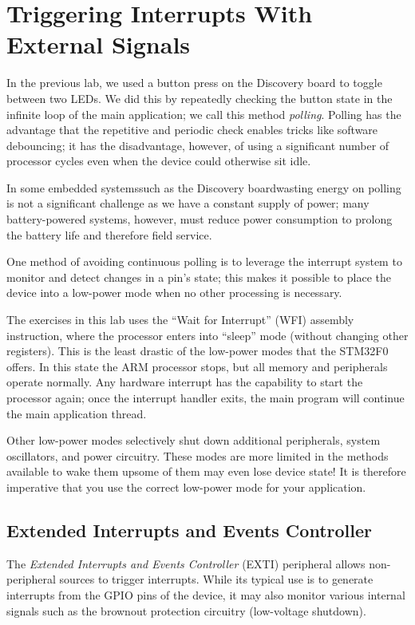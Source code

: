 \documentclass[openany,11pt,fleqn]{book} %
\begin{document}
\section{Triggering Interrupts With External Signals}

In the previous lab, we used a button press on the Discovery board to toggle between two LEDs. We did this by repeatedly checking the button state in the infinite loop of the main application; we call this method \textit{polling}. Polling has the advantage that the repetitive and periodic check enables tricks like software debouncing; it has the disadvantage, however, of using a significant number of processor cycles even when the device could otherwise sit idle. 

In some embedded systems\textemdash such as the Discovery board\textemdash wasting energy on polling is not a significant challenge as we have a constant supply of power; many battery-powered systems, however, must reduce power consumption to prolong the battery life and therefore field service.

One method of avoiding continuous polling is to leverage the interrupt system to monitor and detect changes in a pin's state; this makes it possible to place the device into a low-power mode when no other processing is necessary. 

The exercises in this lab uses the ``Wait for Interrupt'' (WFI) assembly instruction, where the processor enters into ``sleep'' mode (without changing other registers). This is the least drastic of the low-power modes that the STM32F0 offers. In this state the ARM processor stops, but all memory and peripherals operate normally. Any hardware interrupt has the capability to start the processor again; once the interrupt handler exits, the main program will continue the main application thread. 

Other low-power modes selectively shut down additional peripherals, system oscillators, and power circuitry. These modes are more limited in the methods available to wake them up\textemdash some of them may even lose device state! It is therefore imperative that you use the correct low-power mode for your application.  

\subsection{Extended Interrupts and Events Controller} \label{exti}

The \textit{Extended Interrupts and Events Controller} (EXTI) peripheral allows non-peripheral sources to trigger interrupts. While its typical use is to generate interrupts from the GPIO pins of the device, it may also monitor various internal signals such as the brownout protection circuitry (low-voltage shutdown).
\end{document}
